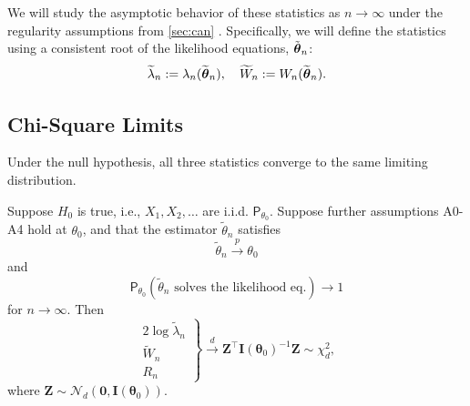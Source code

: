 We will study the asymptotic behavior of these statistics as $n \to \infty$ under the regularity assumptions from \autoref{sec:can} . Specifically, we will define the statistics using a consistent root of the likelihood equations, $\tilde{\boldsymbol{\theta}}_n$:
\[ \widetilde{\lambda}_n := \lambda_n(\widetilde{\boldsymbol{\theta}}_n), \quad \widetilde{W}_n := W_n(\widetilde{\boldsymbol{\theta}}_n). \]

\subsection{Chi-Square Limits}
\label{sub:Chi-Square-Limits}

Under the null hypothesis, all three statistics converge to the same limiting distribution.

\begin{theo}
\label{theo:Null-Distribution}
Suppose $H_0$ is true, i.e., $X_1, X_2, \dots$ are i.i.d. $\mathsf{P}_{\theta_0}$. Suppose further assumptions A0-A4 hold at $\theta_0$, and that the estimator $\tilde{\theta}_n$ satisfies
\[ \tilde{\theta}_n \stackrel{p}{\longrightarrow} \theta_0 \]
and
\[ \mathsf{P}_{\theta_0}(\tilde{\theta}_n \text{ solves the likelihood eq.}) \longrightarrow 1 \]
for $n \to \infty$. Then
\[ \left. \begin{array}{l} 2\log \tilde{\lambda}_n \\ \widetilde{W}_n \\ R_n \end{array} \right\} \stackrel{d}{\longrightarrow} \mathbf{Z}^{\top} \mathbf{I}(\boldsymbol{\theta}_0)^{-1} \mathbf{Z} \sim \chi_d^2, \]
where $\mathbf{Z} \sim \mathcal{N}_d(\mathbf{0}, \mathbf{I}(\boldsymbol{\theta}_0))$.
\end{theo}

